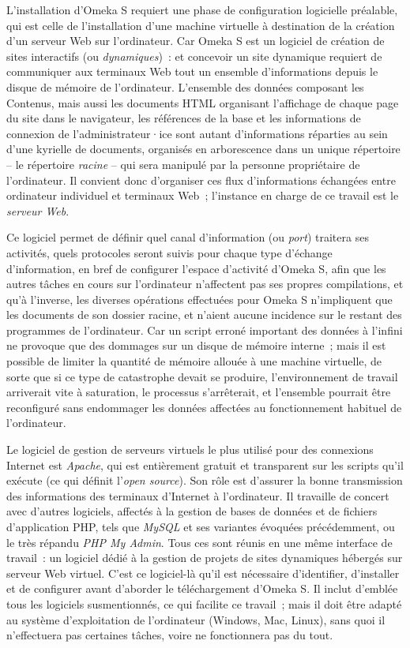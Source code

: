 \documentclass[a4paper,12pt, twoside]{book}
\begin{document}
L’installation d’Omeka S requiert une phase de configuration logicielle préalable, qui est celle de l’installation d’une machine virtuelle à destination de la création d’un serveur Web sur l’ordinateur. Car Omeka S est un logiciel de création de sites interactifs (ou \textit{dynamiques})~: et concevoir un site dynamique requiert de communiquer aux terminaux Web tout un ensemble d’informations depuis le disque de mémoire de l’ordinateur. L’ensemble des données composant les Contenus, mais aussi les documents HTML organisant l’affichage de chaque page du site dans le navigateur, les références de la base et les informations de connexion de l’administrateur·ice sont autant d’informations réparties au sein d’une kyrielle de documents, organisés en arborescence dans un unique répertoire – le répertoire \textit{racine} – qui sera manipulé par la personne propriétaire de l’ordinateur. Il convient donc d’organiser ces flux d’informations échangées entre ordinateur individuel et terminaux Web~; l’instance en charge de ce travail est le \textit{serveur Web}.

Ce logiciel permet de définir quel canal d’information (ou \textit{port}) traitera ses activités, quels protocoles seront suivis pour chaque type d’échange d’information, en bref de configurer l’espace d’activité d’Omeka S, afin que les autres tâches en cours sur l’ordinateur n’affectent pas ses propres compilations, et qu’à l’inverse, les diverses opérations effectuées pour Omeka S n’impliquent que les documents de son dossier racine, et n’aient aucune incidence sur le restant des programmes de l’ordinateur. Car un script erroné important des données à l’infini ne provoque que des dommages sur un disque de mémoire interne~; mais il est possible de limiter la quantité de mémoire allouée à une machine virtuelle, de sorte que si ce type de catastrophe devait se produire, l’environnement de travail arriverait vite à saturation, le processus s’arrêterait, et l’ensemble pourrait être reconfiguré sans endommager les données affectées au fonctionnement habituel de l’ordinateur.

Le logiciel de gestion de serveurs virtuels le plus utilisé pour des connexions Internet est \textit{Apache}, qui est entièrement gratuit et transparent sur les scripts qu’il exécute (ce qui définit l’\textit{open source}). Son rôle est d’assurer la bonne transmission des informations des terminaux d’Internet à l’ordinateur. Il travaille de concert avec d’autres logiciels, affectés à la gestion de bases de données et de fichiers d’application PHP, tels que \textit{MySQL} et ses variantes évoquées précédemment, ou le très répandu \textit{PHP My Admin}. Tous ces sont réunis en une même interface de travail~: un logiciel dédié à la gestion de projets de sites dynamiques hébergés sur serveur Web virtuel. C’est ce logiciel-là qu’il est nécessaire d’identifier, d’installer et de configurer avant d’aborder le téléchargement d’Omeka S. Il inclut d’emblée tous les logiciels susmentionnés, ce qui facilite ce travail~; mais il doit être adapté au système d’exploitation de l’ordinateur (Windows, Mac, Linux), sans quoi il n’effectuera pas certaines tâches, voire ne fonctionnera pas du tout.
\end{document}
